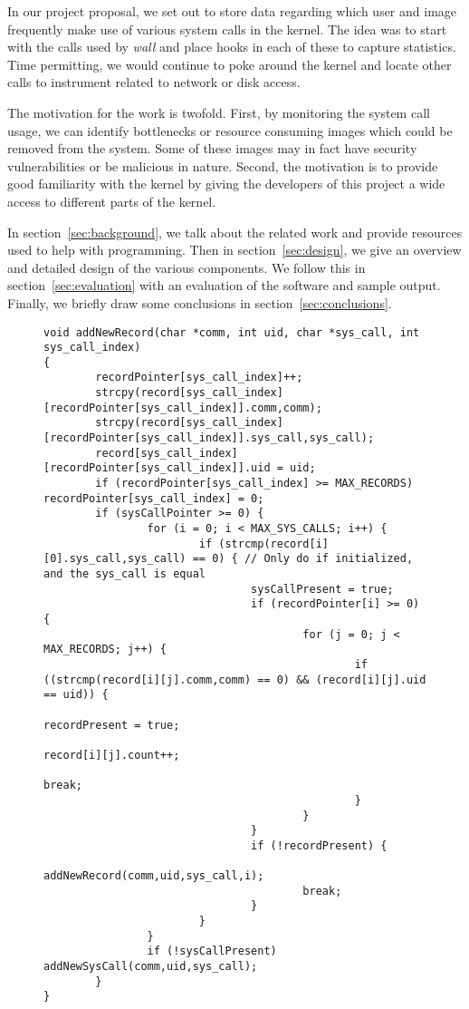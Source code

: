 \documentclass[conference]{IEEEtran}
\begin{document}
In our project proposal, we set out to store data regarding which user and image frequently make use of various system calls in the kernel.
The idea was to start with the calls used by \textit{wall} and place hooks in each of these to capture statistics.
Time permitting, we would continue to poke around the kernel and locate other calls to instrument related to network or disk access.

The motivation for the work is twofold.
First, by monitoring the system call usage, we can identify bottlenecks or resource consuming images which could be removed from the system.
Some of these images may in fact have security vulnerabilities or be malicious in nature.
Second, the motivation is to provide good familiarity with the kernel by giving the developers of this project a wide access to different parts of the kernel.

In section~\ref{sec:background}, we talk about the related work and provide resources used to help with programming.
Then in section~\ref{sec:design}, we give an overview and detailed design of the various components.
We follow this in section~\ref{sec:evaluation} with an evaluation of the software and sample output.
Finally, we briefly draw some conclusions in section~\ref{sec:conclusions}.

\begin{figure}[*]
\begin{lstlisting}
void addNewRecord(char *comm, int uid, char *sys_call, int sys_call_index)
{
        recordPointer[sys_call_index]++;
        strcpy(record[sys_call_index][recordPointer[sys_call_index]].comm,comm);
        strcpy(record[sys_call_index][recordPointer[sys_call_index]].sys_call,sys_call);
        record[sys_call_index][recordPointer[sys_call_index]].uid = uid;
        if (recordPointer[sys_call_index] >= MAX_RECORDS) recordPointer[sys_call_index] = 0;
        if (sysCallPointer >= 0) {
                for (i = 0; i < MAX_SYS_CALLS; i++) {
                        if (strcmp(record[i][0].sys_call,sys_call) == 0) { // Only do if initialized, and the sys_call is equal
                                sysCallPresent = true;
                                if (recordPointer[i] >= 0) {
                                        for (j = 0; j < MAX_RECORDS; j++) {
                                                if ((strcmp(record[i][j].comm,comm) == 0) && (record[i][j].uid == uid)) {
                                                        recordPresent = true;
                                                        record[i][j].count++;
                                                        break;
                                                }
                                        }
                                }
                                if (!recordPresent) {
                                        addNewRecord(comm,uid,sys_call,i);
                                        break;
                                }
                        }
                }
                if (!sysCallPresent) addNewSysCall(comm,uid,sys_call);
        }
}
\end{lstlisting}
\end{figure}
\end{document}
